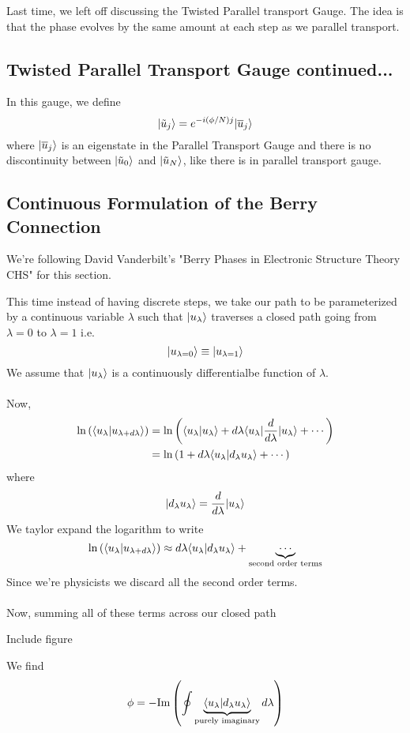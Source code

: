 \documentclass[11pt]{article}
\begin{document}
Last time, we left off discussing the Twisted Parallel transport Gauge. The idea is that the phase evolves by the same amount at each step as we parallel transport.

\subsection*{Twisted Parallel Transport Gauge continued...}

In this gauge, we define $$ \lvert\tilde{u}_j\rangle = e^{-i(\phi/N) j} \lvert\overline{u}_j\rangle $$ where $\lvert\overline{u}_j\rangle$ is an eigenstate in the Parallel Transport Gauge and there is no discontinuity between $\lvert\tilde{u}_0\rangle$ and $\lvert\tilde{u}_N\rangle$, like there is in parallel transport gauge.

\vskip 1cm
\subsection{Continuous Formulation of the Berry Connection}
\begin{thought}
  {We're following David Vanderbilt's "Berry Phases in Electronic Structure Theory CHS" for this section.}
\end{thought} This time instead of having discrete steps, we take our path to be parameterized by a continuous variable $\lambda$ such that $\lvert u_{\lambda}\rangle$ traverses a closed path going from $\lambda = 0$ to $\lambda = 1$ i.e. $$ \lvert u_{\lambda = 0}\rangle \equiv \lvert u_{\lambda = 1}\rangle  $$ We assume that $\lvert u_{\lambda}\rangle$ is a continuously differentialbe function of $\lambda$.
\\
\\
Now,
\begin{align*}
  \mathrm{ln}\left(\langle u_{\lambda} | u_{\lambda+d\lambda} \rangle\right) &= \mathrm{ln} \left( \langle u_{\lambda} | u_{\lambda} \rangle + d\lambda \langle u_{\lambda} | \frac{d}{d\lambda} | u_{\lambda} \rangle + \cdots \right)  \\
  &= \mathrm{ln} \left( 1 + d\lambda \langle u_{\lambda} | d_{\lambda} u_{\lambda}  \rangle + \cdots \right)
\end{align*} where $$ \lvert d_{\lambda} u_{\lambda} \rangle = \frac{d}{d\lambda} \lvert u_{\lambda}\rangle$$ We taylor expand the logarithm to write $$ \mathrm{ln}\left(\langle u_{\lambda} | u_{\lambda+d\lambda} \rangle\right) \approx d\lambda \langle u_{\lambda} | d_{\lambda} u_{\lambda} \rangle + \underbrace{\cdots}_{\text{second order terms}}$$ Since we're physicists we discard all the second order terms.
\\
\\
Now, summing all of these terms across our closed path 
\begin{center}
  Include figure
\end{center} We find $$ \phi = - \mathrm{Im} \left( \oint \underbrace{\langle u_{\lambda} | d_{\lambda} u_{\lambda} \rangle}_{\text{purely imaginary}} d\lambda \right) $$
\end{document}
